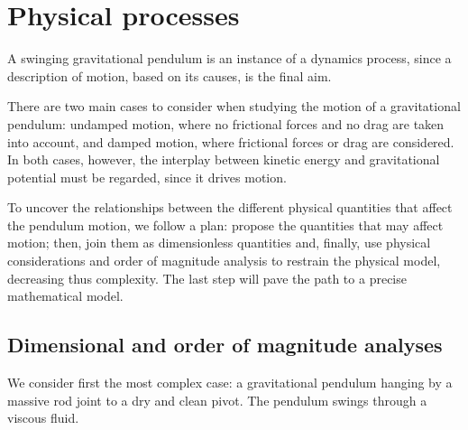 \section{Physical processes}
A swinging gravitational pendulum is an instance of a dynamics process, since a description of motion, based on its causes, is the final aim. 

There are two main cases to consider when studying the motion of a gravitational pendulum: undamped motion, where no frictional forces and no drag are taken into account, and damped motion, where frictional forces or drag are considered. In both cases, however, the interplay between kinetic energy and gravitational potential must be regarded, since it drives motion.

To uncover the relationships between the different physical quantities that affect the pendulum motion, we follow a plan: propose the quantities that may affect motion; then, join them as dimensionless quantities and, finally, use physical considerations and order of magnitude analysis to restrain the physical model, decreasing thus complexity. The last step will pave the path to a precise mathematical model.


\newcommand{\angpos}{\theta}     %
\newcommand{\angvel}{\dt\theta}  %
\newcommand{\angacc}{\ddt\theta} %
\newcommand{\torque}{\tau}       %
\newcommand{\fcoeff}{\alpha}     %


\subsection{Dimensional and order of magnitude analyses}\label{subsec:dimanalysisorderofmag}
We consider first the most complex case: a gravitational pendulum hanging by a massive rod joint to a dry and clean pivot. The pendulum swings through a viscous fluid.

